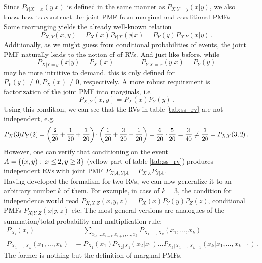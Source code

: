 Since $P_{Y | X = x}(y | x)$ is defined in the same manner as $P_{X | Y = y}(x | y)$, we also know how to construct the joint PMF from marginal and conditional PMFs. Some rearranging yields the already well-known relation
\begin{equation}\label{eq:joint_pmf}
P_{X, Y}(x, y) =  P_X(x) P_{Y | X}(y | x) = P_Y(y) P_{X | Y}(x | y) \, .
\end{equation}
Additionally, as we might guess from conditional probabilities of events, the joint PMF naturally leads to the notion of  of RVs. And just like before, while
\begin{equation}
P_{X | Y = y}(x | y) = P_X(x) \qquad \qquad P_{Y | X = x}(y | x) = P_Y(y)
\end{equation}
may be more intuitive to demand, this is only defined for $P_Y(y) \neq 0, P_X(x) \neq 0$, respectively. A more robust requirement is factorization of the joint PMF into marginals, i.e.
\begin{equation}
P_{X, Y}(x, y) = P_X(x) P_Y(y) \, .
\end{equation}
Using this condition, we can see that the RVs in table \ref{tab:ss_rv} are not independent, e.g.
\begin{equation*}
P_X(3) P_Y(2) = \qty(\frac{2}{20} + \frac{1}{20} + \frac{3}{20}) \cdot \qty(\frac{1}{20} + \frac{3}{20} + \frac{1}{20}) = \frac{6}{20} \cdot \frac{5}{20} = \frac{3}{40} \neq \frac{3}{20} = P_{X, Y}(3, 2) \, .
\end{equation*}
However, one can verify that conditioning on the event $A = \qty{(x, y): \; x \leq 2, y \geq 3}$ (yellow part of table \ref{tab:ss_rv}) produces independent RVs with joint PMF $P_{X | A, Y | A} = P_{X | A} P_{Y | A}$.\\


Having developed the formalism for two RVs, we can now generalize it to an arbitrary number $k$ of them. For example, in case of $k = 3$, the condition for independence would read $P_{X, Y, Z}(x, y, z) = P_X(x) P_Y(y) P_Z(z)$, conditional PMFs $P_{X | Y, Z}(x | y, z)$ etc. The most general versions are analogues of the summation/total probability and multiplication rule:
\begin{align}
P_{X_i}(x_i) &= \sum_{x_1, \dots x_{i - 1}, x_{i + 1}, \dots, x_k} P_{X_1, \dots, X_k}(x_1, \dots, x_k)
\\
P_{X_1, \dots, X_k}(x_1, \dots, x_k) &= P_{X_1}(x_1) P_{X_2 | X_1}(x_2 | x_1) \dots P_{X_k | X_1, \dots, X_{k - 1}}(x_k | x_1, \dots, x_{k - 1}) \, .
\end{align}
The former is nothing but the definition of marginal PMFs.



